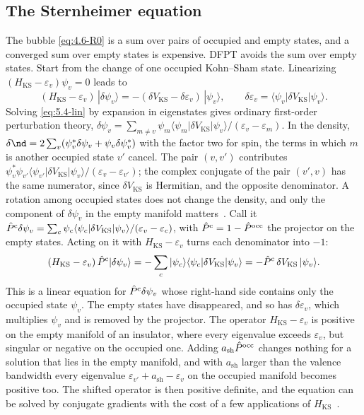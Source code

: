 \subsection{The Sternheimer equation}

The bubble \cref{eq:4.6-R0} is a sum over pairs of occupied and empty states, and a converged sum over empty states is expensive. DFPT avoids the sum over empty states. Start from the change of one occupied Kohn--Sham state. Linearizing $(H_{\mathrm{KS}} - \varepsilon_v)\psi_v = 0$ leads to~\cite[Eq.~(25)]{baroni2001phonons}
\begin{equation}
  (H_{\mathrm{KS}} - \varepsilon_v)\,|\delta\psi_v\rangle = -(\delta V_{\mathrm{KS}} - \delta\varepsilon_v)\,|\psi_v\rangle , \qquad \delta\varepsilon_v = \langle\psi_v|\delta V_{\mathrm{KS}}|\psi_v\rangle .
  \label{eq:5.4-lin}
\end{equation}
Solving \cref{eq:5.4-lin} by expansion in eigenstates gives ordinary first-order perturbation theory, $\delta\psi_v = \sum_{m\neq v}\psi_m\langle\psi_m|\delta V_{\mathrm{KS}}|\psi_v\rangle/(\varepsilon_v - \varepsilon_m)$. In the density, $\delta\nd = 2\sum_v(\psi_v^*\delta\psi_v + \psi_v\delta\psi_v^*)$ with the factor two for spin, the terms in which $m$ is another occupied state $v'$ cancel. The pair $(v,v')$ contributes $\psi_v^*\psi_{v'}\langle\psi_{v'}|\delta V_{\mathrm{KS}}|\psi_v\rangle/(\varepsilon_v - \varepsilon_{v'})$; the complex conjugate of the pair $(v',v)$ has the same numerator, since $\delta V_{\mathrm{KS}}$ is Hermitian, and the opposite denominator. A rotation among occupied states does not change the density, and only the component of $\delta\psi_v$ in the empty manifold matters~\cite[Eq.~(29)]{baroni2001phonons}. Call it $\hat{P}^{\mathrm{c}}\delta\psi_v = \sum_c\psi_c\langle\psi_c|\delta V_{\mathrm{KS}}|\psi_v\rangle/(\varepsilon_v - \varepsilon_c)$, with $\hat{P}^{\mathrm{c}} = 1 - \hat{P}^{\mathrm{occ}}$ the projector on the empty states. Acting on it with $H_{\mathrm{KS}} - \varepsilon_v$ turns each denominator into $-1$:
\begin{equation*}
  (H_{\mathrm{KS}} - \varepsilon_v)\,\hat{P}^{\mathrm{c}}|\delta\psi_v\rangle = -\sum_c|\psi_c\rangle\langle\psi_c|\delta V_{\mathrm{KS}}|\psi_v\rangle = -\hat{P}^{\mathrm{c}}\,\delta V_{\mathrm{KS}}\,|\psi_v\rangle .
\end{equation*}
This is a linear equation for $\hat{P}^{\mathrm{c}}\delta\psi_v$ whose right-hand side contains only the occupied state $\psi_v$. The empty states have disappeared, and so has $\delta\varepsilon_v$, which multiplies $\psi_v$ and is removed by the projector. The operator $H_{\mathrm{KS}} - \varepsilon_v$ is positive on the empty manifold of an insulator, where every eigenvalue exceeds $\varepsilon_v$, but singular or negative on the occupied one. Adding $a_{\mathrm{sh}}\hat{P}^{\mathrm{occ}}$ changes nothing for a solution that lies in the empty manifold, and with $a_{\mathrm{sh}}$ larger than the valence bandwidth every eigenvalue $\varepsilon_{v'} + a_{\mathrm{sh}} - \varepsilon_v$ on the occupied manifold becomes positive too. The shifted operator is then positive definite, and the equation can be solved by conjugate gradients with the cost of a few applications of $H_{\mathrm{KS}}$~\cite[Eq.~(30)]{baroni2001phonons}.

